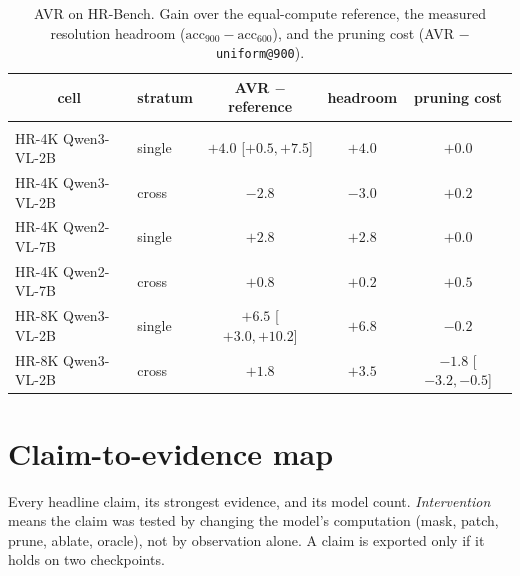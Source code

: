 \begin{table}[t]
\caption{AVR on HR-Bench. Gain over the equal-compute reference, the measured resolution headroom ($\mathrm{acc}_{900}-\mathrm{acc}_{600}$), and the pruning cost (AVR $-$ \texttt{uniform@900}).}
\label{tab:avrhr}
\begin{center}
\small
\begin{tabular}{llccc}
\multicolumn{1}{c}{\bf cell} &\multicolumn{1}{c}{\bf stratum} &\multicolumn{1}{c}{\bf AVR $-$ reference} &\multicolumn{1}{c}{\bf headroom} &\multicolumn{1}{c}{\bf pruning cost}
\\ \hline \\
HR-4K Qwen3-VL-2B & single & $+4.0$ [$+0.5,+7.5$] & $+4.0$ & $+0.0$\\
HR-4K Qwen3-VL-2B & cross & $-2.8$ & $-3.0$ & $+0.2$\\
HR-4K Qwen2-VL-7B & single & $+2.8$ & $+2.8$ & $+0.0$\\
HR-4K Qwen2-VL-7B & cross & $+0.8$ & $+0.2$ & $+0.5$\\
HR-8K Qwen3-VL-2B & single & $+6.5$ [$+3.0,+10.2$] & $+6.8$ & $-0.2$\\
HR-8K Qwen3-VL-2B & cross & $+1.8$ & $+3.5$ & $-1.8$ [$-3.2,-0.5$]\\
\end{tabular}
\end{center}
\end{table}

\section{Claim-to-evidence map}\label{app:claims}

Every headline claim, its strongest evidence, and its model count. \emph{Intervention} means the claim was tested by
changing the model's computation (mask, patch, prune, ablate, oracle), not by observation alone. A claim is exported
only if it holds on two checkpoints.

